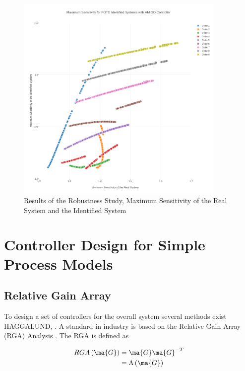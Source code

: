 \begin{figure}[H]
\begin{minipage}[b]{\textwidth}
\centering
\includegraphics[width=0.9\textwidth]{./Graphics/PT9-Study.png}
\caption{Results of the Robustness Study, Maximum Sensitivity of the Real System and the Identified System}
\label{c:control:f:robustness_study}
\end{minipage}
\end{figure}

\section{Controller Design for Simple Process Models}

\subsection*{Relative Gain Array}
To design a set of controllers for the overall system several methods exist HAGGALUND, \cite{Skogestad2005MultivariableDesign}. A standard in industry is based on the Relative Gain Array (RGA) Analysis \cite[p.88 ff.]{Skogestad2005MultivariableDesign}.
The RGA is defined as

\begin{align}
\begin{split}
RGA\left(\ma{G}\right) &= \ma{G} \ma{G}^{-T} \\
&= \Lambda \left(\ma{G}\right) 
\end{split}
\label{c:control:e:RGA}
\end{align}

